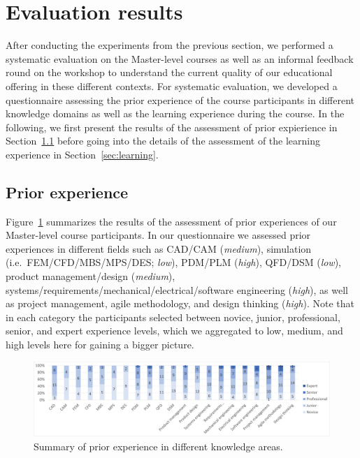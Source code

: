 \documentclass{PDS}
\begin{document}
\section{Evaluation results}
\label{sec:discussion}

After conducting the experiments from the previous section, we performed a systematic evaluation on the Master-level courses as well as an informal feedback round on the workshop to understand the current quality of our educational offering in these different contexts.
For systematic evaluation, we developed a questionnaire assessing the prior experience of the course participants in different knowledge domains as well as the learning experience during the course.
In the following, we first present the results of the assessment of prior expierience in Section~\ref{sec:prior} before going into the details of the assessment of the learning experience in Section~\ref{sec:learning}.

\subsection{Prior experience}
\label{sec:prior}

Figure~\ref{fig:before} summarizes the results of the assessment of prior experiences of our Master-level course participants.
In our questionnaire we assessed prior experiences in different fields such as CAD/CAM (\textit{medium}), simulation (i.e.\ FEM/CFD/MBS/MPS/DES; \textit{low}), PDM/PLM (\textit{high}), QFD/DSM (\textit{low}), product management/design (\textit{medium}), systems/requirements/mechanical/electrical/software engineering (\textit{high}), as well as project management, agile methodology, and design thinking (\textit{high}).
Note that in each category the participants selected between novice, junior, professional, senior, and expert experience levels, which we aggregated to low, medium, and high levels here for gaining a bigger picture.

\begin{figure}[htbp]
    \centering
    \includegraphics[width=\textwidth]{./diagrams/before.png}
    \caption{Summary of prior experience in different knowledge areas.}
    \label{fig:before}
\end{figure}
\end{document}
